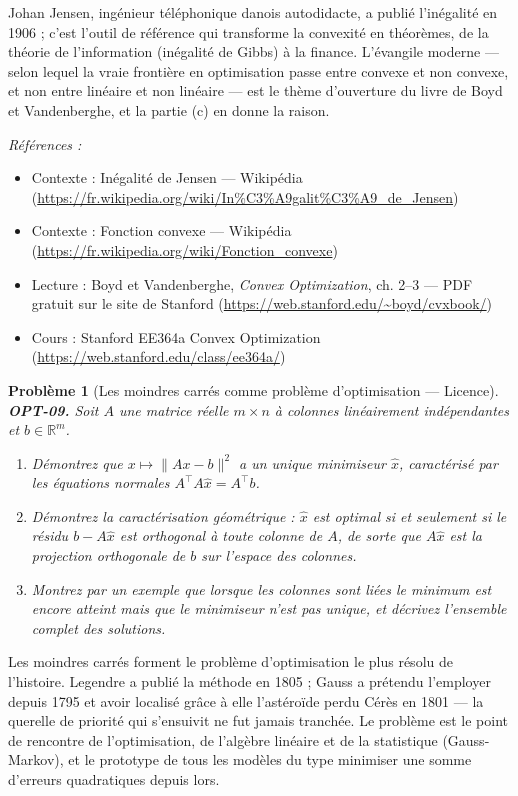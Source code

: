 \documentclass[11pt]{article}
\newtheorem{problem}{Problème}
\newenvironment{refs}{\par\small\noindent\emph{Références :}\begin{itemize}\setlength\itemsep{0pt}}{\end{itemize}\normalsize}
\begin{document}
\noindent Johan Jensen, ingénieur téléphonique danois autodidacte, a publié l'inégalité en 1906 ; c'est l'outil de référence qui transforme la convexité en théorèmes, de la théorie de l'information (inégalité de Gibbs) à la finance. L'évangile moderne --- selon lequel la vraie frontière en optimisation passe entre convexe et non convexe, et non entre linéaire et non linéaire --- est le thème d'ouverture du livre de Boyd et Vandenberghe, et la partie (c) en donne la raison.

\begin{refs}
\item Contexte : Inégalité de Jensen --- Wikipédia (\url{https://fr.wikipedia.org/wiki/In%C3%A9galit%C3%A9_de_Jensen})
\item Contexte : Fonction convexe --- Wikipédia (\url{https://fr.wikipedia.org/wiki/Fonction_convexe})
\item Lecture : Boyd et Vandenberghe, \textit{Convex Optimization}, ch. 2--3 --- PDF gratuit sur le site de Stanford (\url{https://web.stanford.edu/~boyd/cvxbook/})
\item Cours : Stanford EE364a Convex Optimization (\url{https://web.stanford.edu/class/ee364a/})
\end{refs}

\bigskip

\begin{problem}[{Les moindres carrés comme problème d'optimisation --- Licence}]
\textbf{OPT-09.} Soit $A$ une matrice réelle $m \times n$ à colonnes linéairement indépendantes et $b \in \mathbb{R}^m$.
\begin{enumerate}
\item[(a)] Démontrez que $x \mapsto \|Ax - b\|^2$ a un unique minimiseur $\hat{x}$, caractérisé par les équations normales $A^\top A \hat{x} = A^\top b$.
\item[(b)] Démontrez la caractérisation géométrique : $\hat{x}$ est optimal si et seulement si le résidu $b - A\hat{x}$ est orthogonal à toute colonne de $A$, de sorte que $A\hat{x}$ est la projection orthogonale de $b$ sur l'espace des colonnes.
\item[(c)] Montrez par un exemple que lorsque les colonnes sont liées le minimum est encore atteint mais que le minimiseur n'est pas unique, et décrivez l'ensemble complet des solutions.
\end{enumerate}

\end{problem}

\noindent Les moindres carrés forment le problème d'optimisation le plus résolu de l'histoire. Legendre a publié la méthode en 1805 ; Gauss a prétendu l'employer depuis 1795 et avoir localisé grâce à elle l'astéroïde perdu Cérès en 1801 --- la querelle de priorité qui s'ensuivit ne fut jamais tranchée. Le problème est le point de rencontre de l'optimisation, de l'algèbre linéaire et de la statistique (Gauss-Markov), et le prototype de tous les modèles du type \og{} minimiser une somme d'erreurs quadratiques \fg{} depuis lors.
\end{document}
